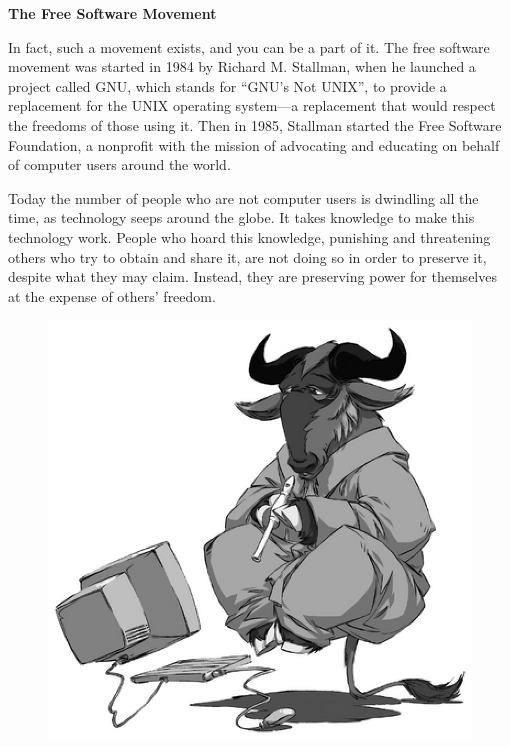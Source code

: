 \documentclass[twoside,12pt]{article}
\begin{document}
\begin{center}
{\Large\bf The Free Software Movement}
\end{center}

In fact, such a movement exists, and you can be a part of it. The free software
movement was started in 1984 by Richard M. Stallman, when he launched a project
called GNU, which stands for ``GNU's Not UNIX'', to provide a replacement for
the UNIX operating system---a replacement that would respect the freedoms of
those using it. Then in 1985, Stallman started the Free Software Foundation, a
nonprofit with the mission of advocating and educating on behalf of computer
users around the world.

Today the number of people who are not computer users is dwindling all the
time, as technology seeps around the globe. It takes knowledge to make this
technology work. People who hoard this knowledge, punishing and threatening
others who try to obtain and share it, are not doing so in order to preserve
it, despite what they may claim. Instead, they are preserving power for
themselves at the expense of others' freedom.

\begin{figure}
  \vspace{-0.25in}
  \begin{center}
    \includegraphics[scale=0.45]{gnu-think-smaller.eps}
  \end{center}
\end{figure}
\end{document}
